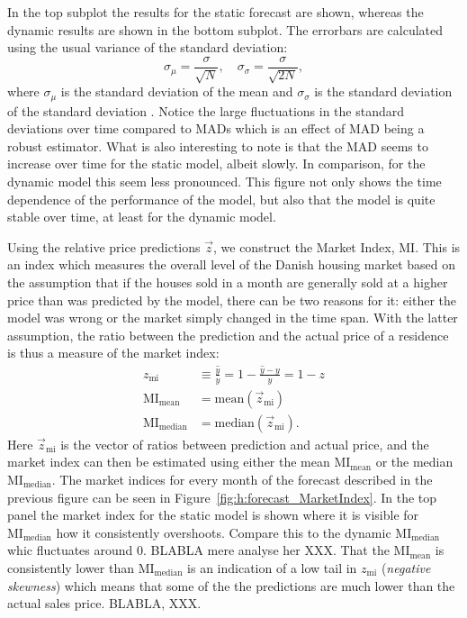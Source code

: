 In the top subplot the results for the static forecast are shown, whereas the dynamic results are shown in the bottom subplot. The errorbars are calculated using the usual variance of the standard deviation:
\begin{equation}
  \sigma_\mu  = \frac{\sigma}{\sqrt{N}}, \quad \sigma_\sigma = \frac{\sigma}{\sqrt{2N}},
\end{equation}
where $\sigma_\mu$ is the standard deviation of the mean and $\sigma_\sigma$ is the standard deviation of the standard deviation \autocite{Barlow:0471922951}.
Notice the large fluctuations in the standard deviations over time compared to MADs which is an effect of MAD being a robust estimator. What is also interesting to note is that the MAD seems to increase over time for the static model, albeit slowly. In comparison, for the dynamic model this seem less pronounced. This figure not only shows the time dependence of the performance of the model, but also that the model is quite stable over time, at least for the dynamic model. 

Using the relative price predictions $\vec{z}$, we construct the Market Index, $\mathrm{MI}$. This is an index which measures the overall level of the Danish housing market based on the assumption that if the houses sold in a month are generally sold at a higher price than was predicted by the model, there can be two reasons for it: either the model was wrong or the market simply changed in the time span. With the latter assumption, the ratio between the prediction and the actual price of a residence is thus a measure of the market index:
\begin{equation}
  \begin{split}
    z_\mathrm{mi} &\equiv \frac{\hat{y}}{y} = 1 - \frac{\hat{y}-y}{y}  = 1-z \\
    \mathrm{MI}_\mathrm{mean} &= \mathrm{mean}(\vec{z}_\mathrm{mi}) \\
    \mathrm{MI}_\mathrm{median} &= \mathrm{median}(\vec{z}_\mathrm{mi}).
    \label{eq:h:market_index}
  \end{split}
\end{equation}
Here $\vec{z}_\mathrm{mi}$ is the vector of ratios between prediction and actual price, and the market index can then be estimated using either the mean $\mathrm{MI}_\mathrm{mean}$ or the median $\mathrm{MI}_\mathrm{median}$. The market indices for every month of the forecast described in the previous figure can be seen in Figure~\ref{fig:h:forecast_MarketIndex}. In the top panel the market index for the static model is shown where it is visible for $\mathrm{MI}_\mathrm{median}$ how it consistently overshoots. Compare this to the dynamic $\mathrm{MI}_\mathrm{median}$ whic fluctuates around \num{0}. BLABLA mere analyse her XXX. That the $\mathrm{MI}_\mathrm{mean}$ is consistently lower than $\mathrm{MI}_\mathrm{median}$ is an indication of a low tail in $z_\mathrm{mi}$ (\emph{negative skewness}) which means that some of the the predictions are much lower than the actual sales price. BLABLA, XXX. \TODO

